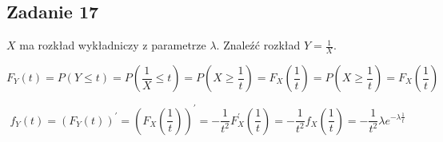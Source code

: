 \subsection{Zadanie 17}

$X$ ma rozkład wykładniczy z parametrze $\lambda$. Znaleźć rozkład $Y = \frac{1}{X}$.

$$
F_Y(t)=P(Y \le t)=P(\frac{1}{X} \le t)=P(X \ge \frac{1}{t})=F_X(\frac{1}{t})=P(X \ge \frac{1}{t})=F_X(\frac{1}{t})
$$

$$
f_Y(t)=(F_Y(t))^{'}=(F_X(\frac{1}{t}))^{'}=-\frac{1}{t^2}F^{'}_X(\frac{1}{t})=-\frac{1}{t^2}f_X(\frac{1}{t})=-\frac{1}{t^2}\lambda e^{-\lambda \frac{1}{t}}
$$
